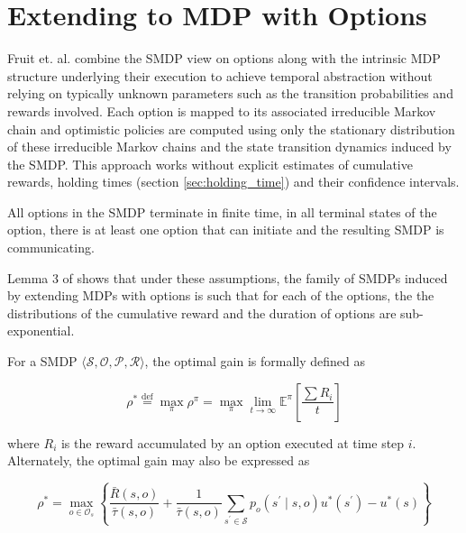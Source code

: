 \section{Extending to MDP with Options}

Fruit et. al. \cite{fruit_exploration--exploitation_2017, fruit_regret_2017} combine the SMDP view on options along with the intrinsic MDP structure underlying their execution to achieve temporal abstraction without relying on typically unknown parameters such as the transition probabilities and rewards involved.
Each option is mapped to its associated irreducible Markov chain and optimistic policies are computed using only the stationary distribution of these irreducible Markov chains and the state transition dynamics induced by the SMDP. 
This approach works without explicit estimates of cumulative rewards, holding times (section \ref{sec:holding_time}) and their confidence intervals.

\begin{assumption}
\label{asm:option}
All options in the SMDP terminate in finite time, in all terminal states of the option, there is at least one option that can initiate and the resulting SMDP is communicating.
\end{assumption}
Lemma 3 of \cite{fruit_exploration--exploitation_2017} shows that under these assumptions, the family of SMDPs induced by extending MDPs with options is such that for each of the options, the the distributions of the cumulative reward and the duration of options are sub-exponential.

For a SMDP $\langle \mathcal{S}, \mathcal{O}, \mathcal{P}, \mathcal{R} \rangle$, the optimal gain is formally defined as 

\begin{equation}
    \rho^* \overset{\mathrm{def}}{=} \max_\pi \rho^\pi = \max_\pi \lim_{t \to \infty} \mathbb{E}^\pi \left[ \frac{\sum{R_i}}{t} \right]
\end{equation}

where $R_i$ is the reward accumulated by an option executed at time step $i$. Alternately, the optimal gain may also be expressed as

\begin{equation}
    \label{eq:optimal_bias}
    \rho^* = \max_{o \in \mathcal{O}_s} \left\{ \frac{\bar{R}(s, o)}{\bar{\tau}(s, o)} + \frac{1}{\bar{\tau}(s, o)} \sum_{s^\prime \in \mathcal{S}} p_o(s^\prime \mid s, o) u^*(s^\prime) - u^*(s) \right\}
\end{equation}

